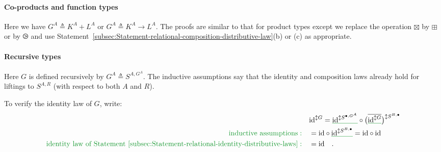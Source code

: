 \paragraph{Co-products and function types}

Here we have $G^{A}\triangleq K^{A}+L^{A}$ or $G^{A}\triangleq K^{A}\rightarrow L^{A}$.
The proofs are similar to that for product types except we replace
the operation $\boxtimes$ by $\boxplus$ or by $\ogreaterthan$ and
use Statement~\ref{subsec:Statement-relational-composition-distributive-law}(b)
or (c) as appropriate.

\paragraph{Recursive types}

Here $G$ is defined recursively by $G^{A}\triangleq S^{A,G^{A}}$.
The inductive assumptions say that the identity and composition laws
already hold for liftings to $S^{A,R}$ (with respect to both $A$
and $R$).

To verify the identity law of $G$, write:
\begin{align*}
 & \text{id}^{\updownarrow G}=\gunderline{\text{id}^{\updownarrow S^{\bullet,G^{A}}}}\circ\big(\overline{\gunderline{\text{id}^{\updownarrow G}}}\big)^{\updownarrow S^{B,\bullet}}\\
{\color{greenunder}\text{inductive assumptions}:}\quad & =\text{id}\circ\gunderline{\text{id}^{\updownarrow S^{B,\bullet}}}=\text{id}\circ\text{id}\\
{\color{greenunder}\text{identity law of Statement~\ref{subsec:Statement-relational-identity-distributive-laws}}:}\quad & =\text{id}\quad.
\end{align*}

